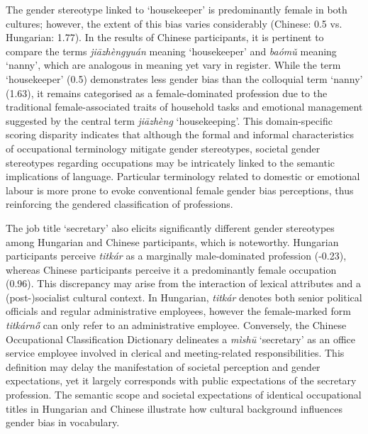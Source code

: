 \documentclass[11pt]{article}
\newcommand{\zh}[1]{\simplifiedchinesefont{#1}\rmfamily}
\begin{document}


The gender stereotype linked to `housekeeper' is predominantly female in both cultures; however, the extent of this bias varies considerably (Chinese: 0.5 vs. Hungarian: 1.77). In the results of Chinese participants, it is pertinent to compare the terms \zh{家政员} \textit{jiāzhèngyuán} meaning `housekeeper' and \zh{保姆} \textit{baómǔ} meaning `nanny', which are analogous in meaning yet vary in register. While the term `housekeeper' (0.5) demonstrates less gender bias than the colloquial term `nanny' (1.63), it remains categorised as a female-dominated profession due to the traditional female-associated traits of household tasks and emotional management suggested by the central term \zh{家政} \textit{jiāzhèng} `housekeeping'. This domain-specific scoring disparity indicates that although the formal and informal characteristics of occupational terminology mitigate gender stereotypes, societal gender stereotypes regarding occupations may be intricately linked to the semantic implications of language. Particular terminology related to domestic or emotional labour is more prone to evoke conventional female gender bias perceptions, thus reinforcing the gendered classification of professions.

The job title `secretary' also elicits significantly different gender stereotypes among Hungarian and Chinese participants, which is noteworthy. Hungarian participants perceive \textit{titkár} as a marginally male-dominated profession (-0.23), whereas Chinese participants perceive it a predominantly female occupation (0.96). This discrepancy may arise from the interaction of lexical attributes and a (post-)socialist cultural context. In Hungarian, \textit{titkár} denotes both senior political officials and regular administrative employees, however the female-marked form \textit{titkárnő} can only refer to an administrative employee. Conversely, the Chinese Occupational Classification Dictionary delineates a \zh{秘书} \textit{mìshū} `secretary' as an office service employee involved in clerical and meeting-related responsibilities. This definition may delay the manifestation of societal perception and gender expectations, yet it largely corresponds with public expectations of the secretary profession. The semantic scope and societal expectations of identical occupational titles in Hungarian and Chinese illustrate how cultural background influences gender bias in vocabulary.
\end{document}
